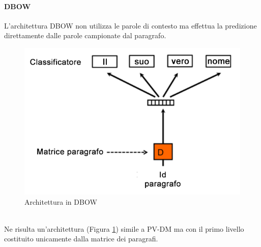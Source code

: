 \documentclass[12pt]{report}
\theoremstyle{definition}
\begin{document}
\paragraph{DBOW}
L'architettura DBOW non utilizza le parole di contesto ma effettua la predizione direttamente dalle parole campionate dal paragrafo.
\\
\begin{figure}
    \centering
    \includegraphics[scale = 0.45]{images/dbow.png}
    \caption{Architettura in DBOW}
    \label{dbow}
\end{figure}
\\
Ne risulta un'architettura (Figura \ref{dbow}) simile a PV-DM ma con il primo livello costituito unicamente dalla matrice dei paragrafi.
\end{document}
